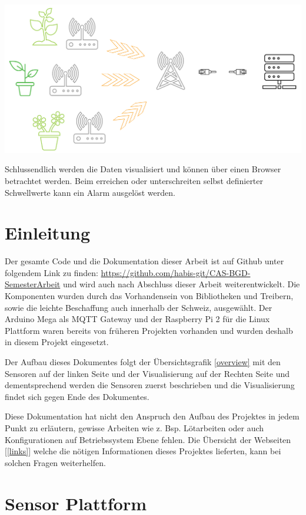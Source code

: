 \documentclass[
  12pt, %
  a4paper, %
  twoside, %
  openany, %
  numbers=noenddot, %
  BCOR=5mm, %
  parskip=half*, %
  thesis, %
]{bfhbook}
\begin{document}
  \begin{center}
    \includegraphics[width=14cm, left]{Bilder/Overview-2.png}
     \captionsetup{justification=centering}
  \end{center}
  Schlussendlich werden die Daten visualisiert und können über einen Browser betrachtet werden. Beim erreichen oder unterschreiten selbst definierter Schwellwerte kann ein Alarm ausgelöst werden.
\chapter{Einleitung}
Der gesamte Code und die Dokumentation dieser Arbeit ist auf Github unter folgendem Link zu finden: \url{https://github.com/habis-git/CAS-BGD-SemesterArbeit} und wird auch nach Abschluss dieser Arbeit weiterentwickelt. Die Komponenten wurden durch das Vorhandensein von Bibliotheken und Treibern, sowie die leichte Beschaffung auch innerhalb der Schweiz, ausgewählt. Der Arduino Mega als MQTT Gateway und der Raspberry Pi 2 für die Linux Plattform waren bereits von früheren Projekten vorhanden und wurden deshalb in diesem Projekt eingesetzt.

Der Aufbau dieses Dokumentes folgt der Übersichtsgrafik  \ref{overview} mit den Sensoren auf der linken Seite und der Visualisierung auf der Rechten Seite und dementsprechend werden die Sensoren zuerst beschrieben und die Visualisierung findet sich gegen Ende des Dokumentes.

Diese Dokumentation hat nicht den Anspruch den Aufbau des Projektes in jedem Punkt zu erläutern, gewisse Arbeiten wie z. Bsp. Lötarbeiten oder auch Konfigurationen auf Betriebssystem Ebene fehlen. Die Übersicht der Webseiten [\ref{links}] welche die nötigen Informationen dieses Projektes lieferten, kann bei solchen Fragen weiterhelfen.

\chapter{Sensor Plattform}
\end{document}
